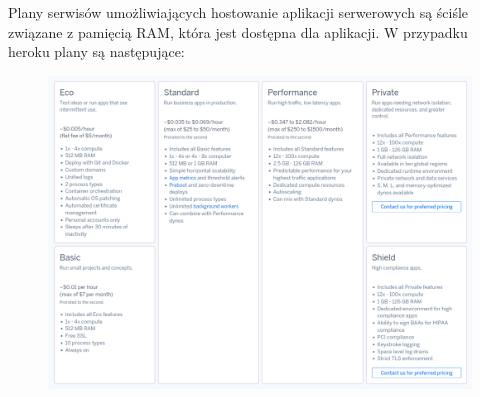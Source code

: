 Plany serwisów umożliwiających hostowanie aplikacji serwerowych są ściśle związane z pamięcią RAM, która jest dostępna dla aplikacji.
W przypadku heroku plany są następujące:
\begin{figure}[H]
    \centering
    \includegraphics[width=15cm,keepaspectratio]{rysunki/heroku-pricing.png}
    \label{fig:herokuPlans}
\end{figure}

